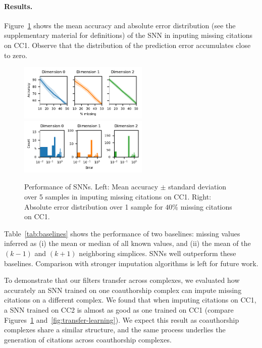 \paragraph{Results.}
Figure~\ref{fig:accuracy-error} shows the mean accuracy and absolute error distribution (see the supplementary material for definitions) of the SNN in inputing missing citations on CC1. Observe that the distribution of the prediction error accumulates close to zero.

\begin{figure}[htbp]
  \centering
  \includegraphics[height=2.7cm]{figures/performance_accuracy.pdf}
  \hfill
  \includegraphics[height=2.7cm]{figures/performance_error.pdf}
  \caption{%
    Performance of SNNs.
    Left: Mean accuracy $\pm$ standard deviation over 5 samples in imputing missing citations on CC1.
    Right: Absolute error distribution over 1 sample for $40\%$ missing citations on CC1.
  }\label{fig:accuracy-error}
\end{figure}

Table~\ref{tab:baselines} shows the performance of two baselines: missing values inferred as (i) the mean or median of all known values, and (ii) the mean of the $(k-1)$ and $(k+1)$ neighboring simplices.
SNNs well outperform these baselines.
Comparison with stronger imputation algorithms is left for future work.

To demonstrate that our filters transfer across complexes, we evaluated how accurately an SNN trained on one coauthorship complex can impute missing citations on a different complex.
We found that when imputing citations on CC1, a SNN trained on CC2 is almost as good as one trained on CC1 (compare Figures~\ref{fig:accuracy-error} and~\ref{fig:transfer-learning}).
We expect this result as coauthorship complexes share a similar structure, and the same process underlies the generation of citations across coauthorship complexes.

